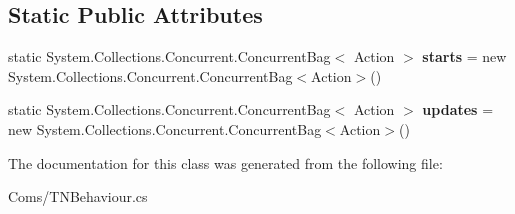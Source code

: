 \subsection*{Static Public Attributes}
\begin{DoxyCompactItemize}
\item 
\mbox{\label{class_t_net_1_1_coms_1_1_t_n_behaviour_a1ff1c091e04f6d2c6ec6f90c404e58f7}} 
static System.\+Collections.\+Concurrent.\+Concurrent\+Bag$<$ Action $>$ {\bfseries starts} = new System.\+Collections.\+Concurrent.\+Concurrent\+Bag$<$Action$>$()
\item 
\mbox{\label{class_t_net_1_1_coms_1_1_t_n_behaviour_a9860f9aa0ba9b7b8b76493aa59da89aa}} 
static System.\+Collections.\+Concurrent.\+Concurrent\+Bag$<$ Action $>$ {\bfseries updates} = new System.\+Collections.\+Concurrent.\+Concurrent\+Bag$<$Action$>$()
\end{DoxyCompactItemize}


The documentation for this class was generated from the following file\+:\begin{DoxyCompactItemize}
\item 
Coms/T\+N\+Behaviour.\+cs\end{DoxyCompactItemize}
